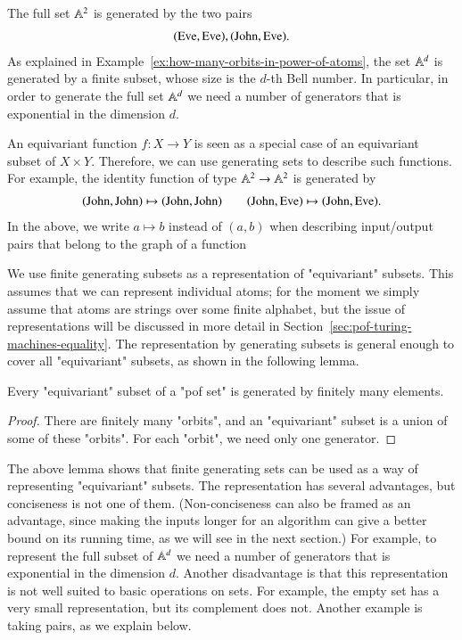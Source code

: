 \begin{myexample}\label{ex:generating-subsets}
    The full set $\mathbb A^2$ is generated by the two pairs 
    \begin{align*}
    (\text{Eve},\text{Eve}), (\text{John},\text{Eve}).
    \end{align*}
    As explained in Example~\ref{ex:how-many-orbits-in-power-of-atoms}, the set $\mathbb A^d$ is generated by a finite subset, whose size is the $d$-th Bell number. In particular, in order to generate the full set $\mathbb A^d$ we need a number of generators that is exponential in the dimension $d$. 
\end{myexample}

\begin{myexample}
    An equivariant function $f : X \to Y$ is seen as a special case of an equivariant subset of $X \times Y$. Therefore, we can use generating sets to describe such functions.  For example, the identity function of type $\mathbb A^2 \to \mathbb A^2$ is generated by
    \begin{align*}
    (\text{John},\text{John}) \mapsto (\text{John},\text{John}) \qquad  
    (\text{John},\text{Eve}) \mapsto (\text{John},\text{Eve}).
    \end{align*}
    In the above, we write $a \mapsto b$ instead of $(a,b)$ when  describing input/output pairs that belong to the graph of a function
\end{myexample}

We  use finite generating subsets as a representation of "equivariant" subsets. This assumes that we can represent individual atoms; for the moment we simply assume that atoms are strings over some finite alphabet, but the  issue of representations  will be discussed in more detail in Section~\ref{sec:pof-turing-machines-equality}. 
The  representation by generating subsets is general enough to cover all "equivariant" subsets, as shown in the following lemma.


\begin{lemma}\label{lem:generating-representation}
    Every "equivariant" subset of a "pof set" is generated by finitely many elements.
\end{lemma}
\begin{proof}
    There are finitely many "orbits", and an "equivariant" subset is a union of some of these "orbits". For each "orbit", we need only one generator. 
\end{proof}

The above lemma shows that finite generating sets can be used as a way of representing  "equivariant" subsets.
The representation has several advantages, but conciseness is not one of them. (Non-conciseness can also be framed as an advantage, since making the inputs longer for an algorithm can give a better bound on its running time, as we will see in the next section.)
 For example, to represent the full subset of $\mathbb A^d$ we need a number of generators that is exponential in the dimension $d$. Another disadvantage is that this representation is not well suited to basic operations on sets. For example, the empty set has a very small representation, but its complement does not. Another example is taking pairs, as we explain below.


